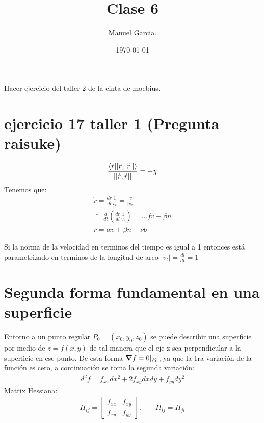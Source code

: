 \documentclass{article}
\title{Clase 6}
\author{Manuel Garcia.}
\date{\today}
\newcommand{\caja}[3]{%
  \begin{tcolorbox}[colback=#1!5!white,colframe=#1!25!black,title=#2]
    #3
  \end{tcolorbox}%
}
\begin{document}
\maketitle

\caja{blue}{Parametrizacion cinta de moebius }{
  Hacer ejercicio del taller 2 de la cinta de moebius.
}
\section{ejercicio 17 taller 1 (Pregunta raisuke)}
\begin{gather}
  \frac{\bra{\dot r }\ket{[\ddot r, \dddot r ]} }{\left|[\dot r, \dot r ]\right|} = - \chi 
\end{gather}
Tenemos que: 
\begin{gather}
  \dot r = \frac{d r  }{d l }\frac{1}{v_t } = \frac{v }{\left|v_z \right|}\\    
  \ddot  = \frac{d}{dt }\left(\frac{d r }{d l} \frac{1}{v_t }\right) = ... f v + \beta n \\
  \dddot r = \alpha v + \beta n + \nu b 
\end{gather}

\caja{black}{Parametrizado en terminos de la longitud de arco }{
  Si la norma de la velocidad en terminos del tiempo es igual a 1 entonces está parametrizado en terminos de la longitud de arco $ \left|v_t \right| = \frac{d l  }{d t} =1 $
}

\section{Segunda forma fundamental en una superficie}
Entorno a un punto regular $ P_0  = (x_0,y_0,z_0) $ se puede describir una superficie por medio de $ z = f\left(x,y\right) $ de tal manera que el eje z sea perpendicular a la superficie en ese punto. De esta forma $ \grad f = 0|_{P_0 } $, ya que la 1ra variación de la función es cero, a continuación se toma la segunda variación: 
\begin{gather}
  d ^ {2 }f = f _{xx } dx ^2 + 2 f _{xy } dx dy + f _{yy } dy ^ {2 }  
\end{gather}
Matrix Hessiana: 
\begin{gather}
  H _{ij }  = \begin{bmatrix}
      f _{xx }  & f _{xy }  \\
      f _{xy }  & f _{yy } 
  \end{bmatrix} . \qquad H _{ij } = H _{ji }   
\end{gather}
\end{document}
